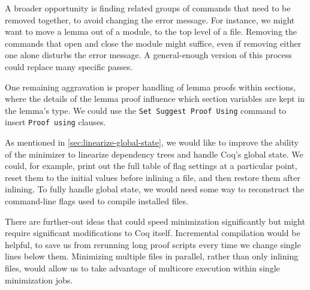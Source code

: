 \documentclass[a4paper,USenglish,cleveref,autoref,thm-restate]{lipics-v2021}
\begin{document}
A broader opportunity is finding related groups of commands that need to be removed together, to avoid changing the error message.
For instance, we might want to move a lemma out of a module, to the top level of a file.
Removing the commands that open and close the module might suffice, even if removing either one alone disturbs the error message.
A general-enough version of this process could replace many specific passes. %

One remaining aggravation is proper handling of lemma proofs within sections, where the details of the lemma proof influence which section variables are kept in the lemma's type.
We could use the \verb|Set Suggest Proof Using| command to insert \verb|Proof using| clauses.

As mentioned in \autoref{sec:linearize-global-state}, we would like to improve the ability of the minimizer to linearize dependency trees and handle Coq's global state.
We could, for example, print out the full table of flag settings at a particular point, reset them to the initial values before inlining a file, and then restore them after inlining.
To fully handle global state, we would need some way to reconstruct the command-line flags used to compile installed files.

There are further-out ideas that could speed minimization significantly but might require significant modifications to Coq itself.
Incremental compilation would be helpful, to save us from rerunning long proof scripts every time we change single lines below them.
Minimizing multiple files in parallel, rather than only inlining files, would allow us to take advantage of multicore execution within single minimization jobs.


\nocite{coqpl-15-coq-bug-minimizer}

\end{document}
